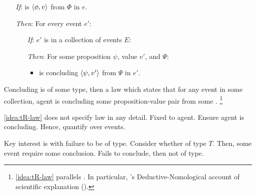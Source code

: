 \begin{note}
  \begin{idea}
    \label{idea:tR-law}

    \begin{itemize}
    \item[\emph{If}:]
      \vAgent{} is \emph{\tCV{}} \(\langle \phi, v \rangle\) from \(\Phi\) in \(e\).
    \item[\emph{Then}:]
      For every event \(e'\):
      \begin{itemize}
      \item[\emph{If}:]
        \(e'\) is in a collection of events \(E\):
      \item[\emph{Then}:]
        For some proposition \(\psi\), value \(v'\), and \pool{} \(\Psi\):
        \begin{itemize}
        \item
          \vAgent{} is concluding \(\langle \psi, v' \rangle\) from \(\Psi\) in \(e'\).
        \end{itemize}
      \end{itemize}
    \end{itemize}
    \vspace{-\baselineskip}
  \end{idea}

  Concluding is of some type, then a law which states that for any event in some collection, agent is concluding some proposition-value pair from some \pool{}.%
  \footnote{
    \autoref{idea:tR-law} parallels \qWhyV{}.
    In particular, \citeauthor{Hempel:1965aa}'s Deductive-Nomological account of scientific explanation ().
  }

  \autoref{idea:tR-law} does not specify law in any detail.
  Fixed to agent.
  Ensure agent is concluding.
  Hence, quantify over events.
\end{note}

\begin{note}
  Key interest is with failure to be of type.
  Consider whether \tC{} of type \(T\).
  Then, some event require some conclusion.
  Fails to conclude, then not of type.
\end{note}

